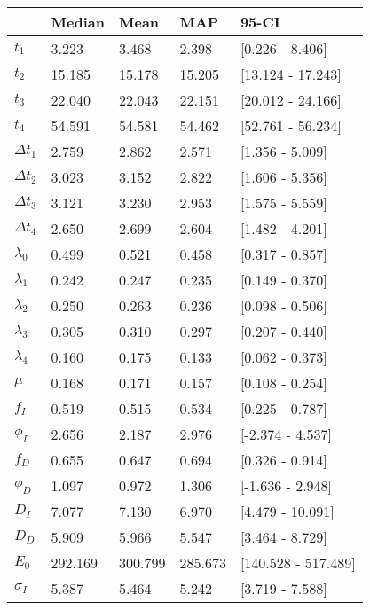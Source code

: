 \begin{tabular}{lllll}
\toprule
{} &   Median &     Mean &      MAP &                95-CI \\
\midrule
$t_1$        &    3.223 &    3.468 &    2.398 &      [0.226 - 8.406] \\
$t_2$        &   15.185 &   15.178 &   15.205 &    [13.124 - 17.243] \\
$t_3$        &   22.040 &   22.043 &   22.151 &    [20.012 - 24.166] \\
$t_4$        &   54.591 &   54.581 &   54.462 &    [52.761 - 56.234] \\
$\Delta t_1$ &    2.759 &    2.862 &    2.571 &      [1.356 - 5.009] \\
$\Delta t_2$ &    3.023 &    3.152 &    2.822 &      [1.606 - 5.356] \\
$\Delta t_3$ &    3.121 &    3.230 &    2.953 &      [1.575 - 5.559] \\
$\Delta t_4$ &    2.650 &    2.699 &    2.604 &      [1.482 - 4.201] \\
$\lambda_0$  &    0.499 &    0.521 &    0.458 &      [0.317 - 0.857] \\
$\lambda_1$  &    0.242 &    0.247 &    0.235 &      [0.149 - 0.370] \\
$\lambda_2$  &    0.250 &    0.263 &    0.236 &      [0.098 - 0.506] \\
$\lambda_3$  &    0.305 &    0.310 &    0.297 &      [0.207 - 0.440] \\
$\lambda_4$  &    0.160 &    0.175 &    0.133 &      [0.062 - 0.373] \\
$\mu$        &    0.168 &    0.171 &    0.157 &      [0.108 - 0.254] \\
$f_I$        &    0.519 &    0.515 &    0.534 &      [0.225 - 0.787] \\
$\phi_I$     &    2.656 &    2.187 &    2.976 &     [-2.374 - 4.537] \\
$f_D$        &    0.655 &    0.647 &    0.694 &      [0.326 - 0.914] \\
$\phi_D$     &    1.097 &    0.972 &    1.306 &     [-1.636 - 2.948] \\
$D_I$        &    7.077 &    7.130 &    6.970 &     [4.479 - 10.091] \\
$D_D$        &    5.909 &    5.966 &    5.547 &      [3.464 - 8.729] \\
$E_0$        &  292.169 &  300.799 &  285.673 &  [140.528 - 517.489] \\
$\sigma_I$   &    5.387 &    5.464 &    5.242 &      [3.719 - 7.588] \\

\end{tabular}
